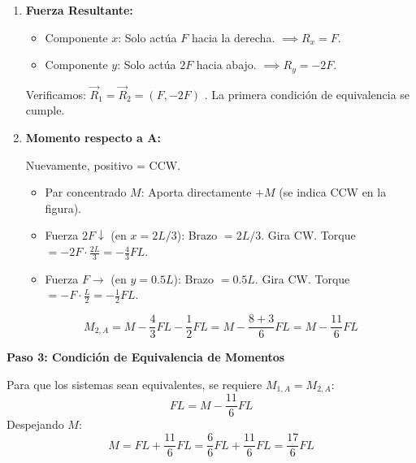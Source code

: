 \documentclass{article}
\begin{document}
\begin{enumerate}
    \item \textbf{Fuerza Resultante:}
    \begin{itemize}
        \item Componente $x$: Solo actúa $F$ hacia la derecha. $\implies R_x = F$.
        \item Componente $y$: Solo actúa $2F$ hacia abajo. $\implies R_y = -2F$.
    \end{itemize}
    Verificamos: $\vec{R}_1 = \vec{R}_2 = (F, -2F)$ \checkmark. La primera condición de equivalencia se cumple.

    \item \textbf{Momento respecto a A:}

    Nuevamente, positivo = CCW.
    \begin{itemize}
        \item Par concentrado $M$: Aporta directamente $+M$ (se indica CCW en la figura).
        \item Fuerza $2F\downarrow$ (en $x = 2L/3$): Brazo $= 2L/3$. Gira CW. Torque $= -2F \cdot \frac{2L}{3} = -\frac{4}{3}FL$.
        \item Fuerza $F\rightarrow$ (en $y = 0.5L$): Brazo $= 0.5L$. Gira CW. Torque $= -F \cdot \frac{L}{2} = -\frac{1}{2}FL$.
    \end{itemize}
    $$ M_{2,A} = M - \frac{4}{3}FL - \frac{1}{2}FL = M - \frac{8 + 3}{6}FL = M - \frac{11}{6}FL $$
\end{enumerate}

\vspace{0.3cm}
\textbf{Paso 3: Condición de Equivalencia de Momentos}

Para que los sistemas sean equivalentes, se requiere $M_{1,A} = M_{2,A}$:
$$ FL = M - \frac{11}{6}FL $$
Despejando $M$:
$$ M = FL + \frac{11}{6}FL = \frac{6}{6}FL + \frac{11}{6}FL = \frac{17}{6}FL $$

\noindent{}
\end{document}
